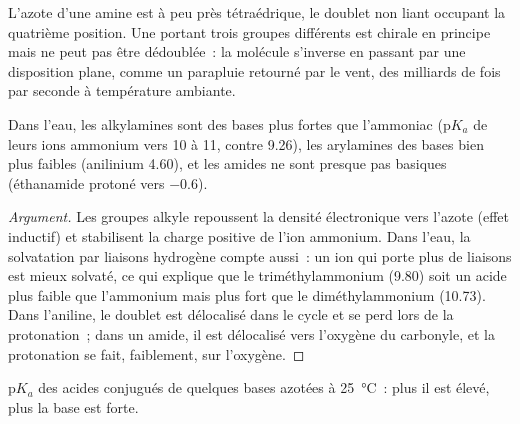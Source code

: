 L'azote d'une amine est à peu près tétraédrique, le doublet non liant occupant la quatrième
position. Une  portant trois groupes différents est chirale en principe mais ne
peut pas être dédoublée~: la molécule s'inverse en passant par une disposition plane, comme un
parapluie retourné par le vent, des milliards de fois par seconde à température ambiante.

\begin{proposition}[Basicité]\label{prop:b2:amines:basicity}
Dans l'eau, les alkylamines sont des bases plus fortes que l'ammoniac ($\mathrm pK_a$ de leurs ions
ammonium vers 10 à 11, contre 9.26), les arylamines des bases bien plus faibles (anilinium 4.60),
et les amides ne sont presque pas basiques (éthanamide protoné vers $-0.6$).
\end{proposition}

\begin{proof}[Argument]
Les groupes alkyle repoussent la densité électronique vers l'azote (effet inductif) et
stabilisent la charge positive de l'ion ammonium. Dans l'eau, la solvatation par liaisons
hydrogène compte aussi~: un ion qui porte plus de liaisons  est mieux solvaté, ce qui
explique que le triméthylammonium (9.80) soit un acide plus faible que l'ammonium mais plus fort
que le diméthylammonium (10.73). Dans l'aniline, le doublet est délocalisé dans le cycle et se
perd lors de la protonation~; dans un amide, il est délocalisé vers l'oxygène du carbonyle, et la
protonation se fait, faiblement, sur l'oxygène.
\end{proof}

\begin{omfigure}

{\small $\mathrm pK_a$ des acides conjugués de quelques bases azotées à
\qty{25}{\degreeCelsius}~: plus il est élevé, plus la base est forte.}
\end{omfigure}

